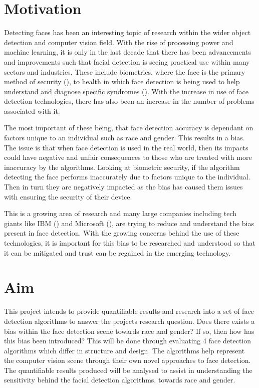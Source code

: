 \documentclass{l4proj}
\begin{document}
\section{Motivation}
\label{motivation}


Detecting faces has been an interesting topic of research within the wider object detection and computer vision field. With the rise of processing power and machine learning, it is only in the last decade that there has been advancements and improvements such that facial detection is seeing practical use within many sectors and industries. These include biometrics, where the face is the primary method of security (\cite{facebio}), to health in which face detection is being used to help understand and diagnose specific syndromes (\cite{facehealth}). With the increase in use of face detection technologies, there has also been an increase in the number of problems associated with it.

The most important of these being, that face detection accuracy is dependant on factors unique to an individual such as race and gender. This results in a bias. The issue is that when face detection is used in the real world, then its impacts could have negative and unfair consequences to those who are treated with more inaccuracy by the algorithms. Looking at biometric security, if the algorithm detecting the face performs inaccurately due to factors unique to the individual. Then in turn they are negatively impacted as the bias has caused them issues with ensuring the security of their device. 

This is a growing area of research and many large companies including tech giants like IBM (\cite{ibm}) and Microsoft (\cite{microsoft}), are trying to reduce and understand the bias present in face detection. With the growing concerns behind the use of these technologies, it is important for this bias to be researched and understood so that it can be mitigated and trust can be regained in the emerging technology.

\section{Aim}
\label{aims}

This project intends to provide quantifiable results and research into a set of face detection algorithms to answer the projects research question. Does there exists a bias within the face detection scene towards race and gender? If so, then how has this bias been introduced? This will be done through evaluating 4 face detection algorithms which differ in structure and design. The algorithms help represent the computer vision scene through their own novel approaches to face detection. The quantifiable results produced will be analysed to assist in understanding the sensitivity behind the facial detection algorithms, towards race and gender.
\end{document}
